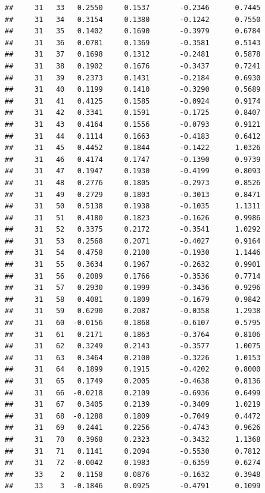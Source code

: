 \documentclass[
]{article}
\begin{document}
\begin{verbatim}
##     31   33   0.2550     0.1537       -0.2346      0.7445  
##     31   34   0.3154     0.1380       -0.1242      0.7550  
##     31   35   0.1402     0.1690       -0.3979      0.6784  
##     31   36   0.0781     0.1369       -0.3581      0.5143  
##     31   37   0.1698     0.1312       -0.2481      0.5878  
##     31   38   0.1902     0.1676       -0.3437      0.7241  
##     31   39   0.2373     0.1431       -0.2184      0.6930  
##     31   40   0.1199     0.1410       -0.3290      0.5689  
##     31   41   0.4125     0.1585       -0.0924      0.9174  
##     31   42   0.3341     0.1591       -0.1725      0.8407  
##     31   43   0.4164     0.1556       -0.0793      0.9121  
##     31   44   0.1114     0.1663       -0.4183      0.6412  
##     31   45   0.4452     0.1844       -0.1422      1.0326  
##     31   46   0.4174     0.1747       -0.1390      0.9739  
##     31   47   0.1947     0.1930       -0.4199      0.8093  
##     31   48   0.2776     0.1805       -0.2973      0.8526  
##     31   49   0.2729     0.1803       -0.3013      0.8471  
##     31   50   0.5138     0.1938       -0.1035      1.1311  
##     31   51   0.4180     0.1823       -0.1626      0.9986  
##     31   52   0.3375     0.2172       -0.3541      1.0292  
##     31   53   0.2568     0.2071       -0.4027      0.9164  
##     31   54   0.4758     0.2100       -0.1930      1.1446  
##     31   55   0.3634     0.1967       -0.2632      0.9901  
##     31   56   0.2089     0.1766       -0.3536      0.7714  
##     31   57   0.2930     0.1999       -0.3436      0.9296  
##     31   58   0.4081     0.1809       -0.1679      0.9842  
##     31   59   0.6290     0.2087       -0.0358      1.2938  
##     31   60  -0.0156     0.1868       -0.6107      0.5795  
##     31   61   0.2171     0.1863       -0.3764      0.8106  
##     31   62   0.3249     0.2143       -0.3577      1.0075  
##     31   63   0.3464     0.2100       -0.3226      1.0153  
##     31   64   0.1899     0.1915       -0.4202      0.8000  
##     31   65   0.1749     0.2005       -0.4638      0.8136  
##     31   66  -0.0218     0.2109       -0.6936      0.6499  
##     31   67   0.3405     0.2139       -0.3409      1.0219  
##     31   68  -0.1288     0.1809       -0.7049      0.4472  
##     31   69   0.2441     0.2256       -0.4743      0.9626  
##     31   70   0.3968     0.2323       -0.3432      1.1368  
##     31   71   0.1141     0.2094       -0.5530      0.7812  
##     31   72  -0.0042     0.1983       -0.6359      0.6274  
##     33    2   0.1158     0.0876       -0.1632      0.3948  
##     33    3  -0.1846     0.0925       -0.4791      0.1099  

\end{verbatim}
\end{document}
